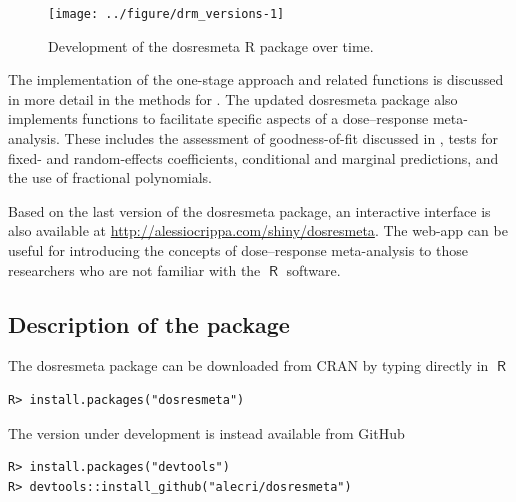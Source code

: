 \documentclass[11pt,a4paper,twoside,openany]{book}\usepackage{knitr}
\newcommand{\pkg}[1]{{\fontseries{b}\selectfont #1}}
\DeclareMathOperator{\R}{\textsf{R}}
\begin{document}
{{\begin{knitrout}\footnotesize
{}\color{fgcolor}\begin{figure}[ht!]

{\centering \texttt{[image: ../figure/drm\_versions-1]} 

}

\caption[Development of the dosresmeta R package over time]{Development of the dosresmeta R package over time.}\label{fig:drm_versions}
\end{figure}


\end{knitrout}

\noindent The implementation of the one-stage approach and related functions is discussed in more detail in the methods for . 
The updated \pkg{dosresmeta} package also implements functions to facilitate specific aspects of a dose--response meta-analysis. These includes the assessment of goodness-of-fit discussed in , tests for fixed- and random-effects coefficients, conditional and marginal predictions, and the use of fractional polynomials.

Based on the last version of the \pkg{dosresmeta} package, an interactive interface is also available at \url{http://alessiocrippa.com/shiny/dosresmeta}. The web-app can be useful for introducing the concepts of dose--response meta-analysis to those researchers who are not familiar with the $\R$ software.

\subsection{Description of the package}

The \pkg{dosresmeta} package can be downloaded from CRAN by typing directly in $\R$
\begin{knitrout}\footnotesize
{}\color{fgcolor}\begin{kframe}
\begin{verbatim}
R> install.packages("dosresmeta")
\end{verbatim}
\end{kframe}
\end{knitrout}
\noindent The version under development is instead available from GitHub
\begin{knitrout}\footnotesize
{}\color{fgcolor}\begin{kframe}
\begin{verbatim}
R> install.packages("devtools")
R> devtools::install_github("alecri/dosresmeta")
\end{verbatim}
\end{kframe}
\end{knitrout}

}}
\end{document}
